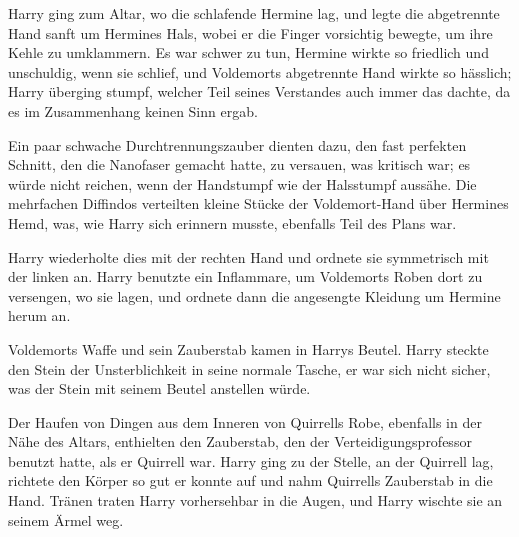Harry ging zum Altar, wo die schlafende Hermine lag, und legte die abgetrennte Hand sanft um Hermines Hals, wobei er die Finger vorsichtig bewegte, um ihre Kehle zu umklammern.
Es war schwer zu tun, Hermine wirkte so friedlich und unschuldig, wenn sie schlief, und Voldemorts abgetrennte Hand wirkte so hässlich; Harry überging stumpf, welcher Teil seines Verstandes auch immer das dachte, da es im Zusammenhang keinen Sinn ergab.

Ein paar schwache Durchtrennungszauber dienten dazu, den fast perfekten Schnitt, den die Nanofaser gemacht hatte, zu versauen, was kritisch war; es würde nicht reichen, wenn der Handstumpf wie der Halsstumpf aussähe. Die mehrfachen Diffindos verteilten kleine Stücke der Voldemort-Hand über Hermines Hemd, was, wie Harry sich erinnern musste, ebenfalls Teil des Plans war.

Harry wiederholte dies mit der rechten Hand und ordnete sie symmetrisch mit der linken an.
Harry benutzte ein Inflammare, um Voldemorts Roben dort zu versengen, wo sie lagen, und ordnete dann die angesengte Kleidung um Hermine herum an.

Voldemorts Waffe und sein Zauberstab kamen in Harrys Beutel. Harry steckte den Stein der Unsterblichkeit in seine normale Tasche, er war sich nicht sicher, was der Stein mit seinem Beutel anstellen würde.

Der Haufen von Dingen aus dem Inneren von Quirrells Robe, ebenfalls in der Nähe des Altars, enthielten den Zauberstab, den der Verteidigungsprofessor benutzt hatte, als er Quirrell war. Harry ging zu der Stelle, an der Quirrell lag, richtete den Körper so gut er konnte auf und nahm Quirrells Zauberstab in die Hand. Tränen traten Harry vorhersehbar in die Augen, und Harry wischte sie an seinem Ärmel weg.

